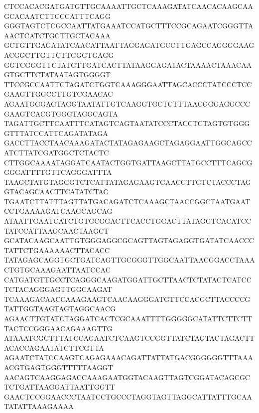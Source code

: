 CTCCACACGATGATGTTGCAAAATTGCTCAAAGATATCAACACAAGCAAGCACAATCTTCCCATTTCAGG
GGGTAGTCTCGCCAATTATGAAATCCATGCTTTCCGCAGAATCGGGTTAAACTCATCTGCTTGCTACAAA
GCTGTTGAGATATCAACATTAATTAGGAGATGCCTTGAGCCAGGGGAAGACGGCTTGTTCTTGGGTGAGG
GGTCGGGTTCTATGTTGATCACTTATAAGGAGATACTAAAACTAAACAAGTGCTTCTATAATAGTGGGGT
TTCCGCCAATTCTAGATCTGGTCAAAGGGAATTAGCACCCTATCCCTCCGAAGTTGGCCTTGTCGAACAC
AGAATGGGAGTAGGTAATATTGTCAAGGTGCTCTTTAACGGGAGGCCCGAAGTCACGTGGGTAGGCAGTA
TAGATTGCTTCAATTTCATAGTCAGTAATATCCCTACCTCTAGTGTGGGGTTTATCCATTCAGATATAGA
GACCTTACCTAACAAAGATACTATAGAGAAGCTAGAGGAATTGGCAGCCATCTTATCGATGGCTCTACTC
CTTGGCAAAATAGGATCAATACTGGTGATTAAGCTTATGCCTTTCAGCGGGGATTTTGTTCAGGGATTTA
TAAGCTATGTAGGGTCTCATTATAGAGAAGTGAACCTTGTCTACCCTAGGTACAGCAACTTCATATCTAC
TGAATCTTATTTAGTTATGACAGATCTCAAAGCTAACCGGCTAATGAATCCTGAAAAGATCAAGCAGCAG
ATAATTGAATCATCTGTGCGGACTTCACCTGGACTTATAGGTCACATCCTATCCATTAAGCAACTAAGCT
GCATACAAGCAATTGTGGGAGGCGCAGTTAGTAGAGGTGATATCAACCCTATTCTGAAAAAACTTACACC
TATAGAGCAGGTGCTGATCAGTTGCGGGTTGGCAATTAACGGACCTAAACTGTGCAAAGAATTAATCCAC
CATGATGTTGCCTCAGGGCAAGATGGATTGCTTAACTCTATACTCATCCTCTACAGGGAGTTGGCAAGAT
TCAAAGACAACCAAAGAAGTCAACAAGGGATGTTCCACGCTTACCCCGTATTGGTAAGTAGTAGGCAACG
AGAACTTGTATCTAGGATCACTCGCAAATTTTGGGGGCATATTCTTCTTTACTCCGGGAACAGAAAGTTG
ATAAATCGGTTTATCCAGAATCTCAAGTCCGGTTATCTAGTACTAGACTTACACCAGAATATCTTCGTTA
AGAATCTATCCAAGTCAGAGAAACAGATTATTATGACGGGGGGTTTAAAACGTGAGTGGGTTTTTAAGGT
AACAGTCAAGGAGACCAAAGAATGGTACAAGTTAGTCGGATACAGCGCTCTGATTAAGGATTAATTGGTT
GAACTCCGGAACCCTAATCCTGCCCTAGGTAGTTAGGCATTATTTGCAATATATTAAAGAAAA

